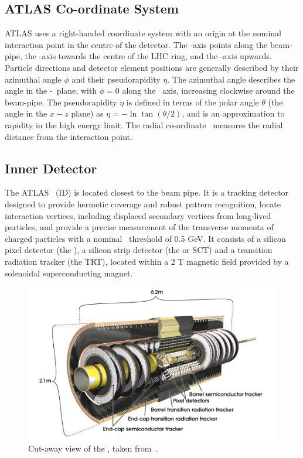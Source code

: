 \subsection{ATLAS Co-ordinate System}
ATLAS uses a right-handed coordinate system with an origin at the nominal
interaction point in the centre of the detector. The \z-axis points along the
beam-pipe, the \x-axis towards the centre of the LHC ring, and the \y-axis
upwards. Particle directions and detector element positions are generally
described by their azimuthal angle $\phi$ and their pseudorapidity $\eta$. The
azimuthal angle describes the angle in the \x-\y\ plane, with $\phi=0$ along the
\x\ axis, increasing clockwise around the beam-pipe.  The pseudorapidity $\eta$
is defined in terms of the polar angle $\theta$ (the angle in the $x-z$ plane)
as $\eta = - \ln\tan(\theta/2)$, and is an approximation to rapidity in the high
energy limit.  The radial co-ordinate \R\ measures the radial distance from the
interaction point. 

\subsection{Inner Detector}

The ATLAS \id\ (ID) is located closest to the beam pipe. It is a tracking
detector designed to provide hermetic coverage and robust pattern recognition, locate
interaction vertices, including displaced secondary vertices from long-lived
particles, and provide a precise measurement of the transverse momenta of charged
particles with a nominal \pt\ threshold of 0.5 GeV. It consists
of a silicon pixel detector (the ), a silicon strip
detector (the  or SCT) and a transition radiation tracker (the TRT), located within a
2 T magnetic field provided by a solenoidal superconducting magnet.

\begin{figure}[h]
\centering
\includegraphics[width=\textwidth]{ID_newTRT_d3}
\caption[Cut-away view of the \id.]{Cut-away view of the \id, taken from~\cite{Aad:1125884}.}
\label{fig:id-1}
\end{figure}

